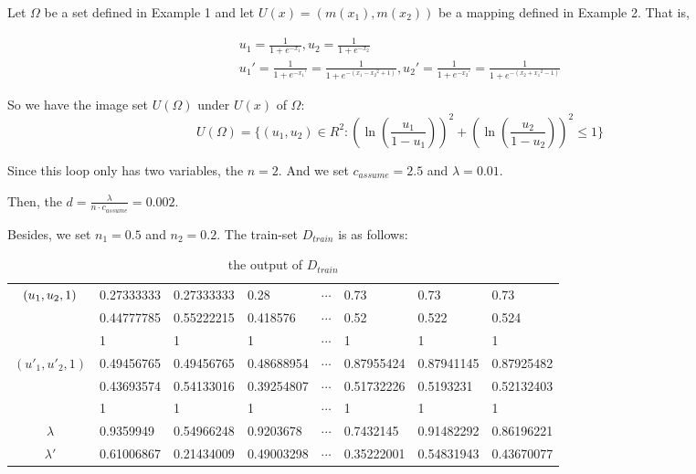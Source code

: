 \begin{exam}\label{exm3}
	Let $\Omega$ be a set defined in Example 1 and let $U(x)=(m(x_1),m(x_2))$ be a mapping defined in Example 2. That is,
	
	$$\begin{array}{l}
	{u_1} = \frac{1}{{1 + {e^{ - {x_1}}}}},{u_2} = \frac{1}{{1 + {e^{ - {x_2}}}}}\\
	{{u_1}'} = \frac{1}{{1 + {e^{ - {{x_1}'}}}}} = \frac{1}{{1 + {e^{ - ({x_1} - {x_2}^2 + 1)}}}},{{u_2}'} = \frac{1}{{1 + {e^{ - {{x_2}'}}}}} = \frac{1}{{1 + {e^{ - ({x_2} + {x_1}^2 - 1)}}}}
	\end{array}$$
	
	So we have the image set $U(\Omega)$ under $U(x)$ of $\Omega$:
	$$U(\Omega ) = \{ ({u_1},{u_2}) \in {R^2}:{(\ln (\frac{{{u_1}}}{{1 - {u_1}}}))^2} + {(\ln (\frac{{{u_2}}}{{1 - {u_2}}}))^2} \le 1\} $$
	
	Since this loop only has two variables, the $n=2$. And we set ${c_{assume}} = 2.5$ and $\lambda  = 0.01$.
	
	Then, the $d = \frac{\lambda }{{n\cdot{c_{assume}}}} = 0.002$.
	
	Besides, we set $n_1=0.5$ and $n_2=0.2$. The train-set $D_{train}$ is as follows:
	
	
	\begin{table}[H]{\label{output of Dtrain}}\label{tabel2}
		\begin{center}
			\setlength{\abovecaptionskip}{0pt}   
			\setlength{\belowcaptionskip}{0pt}
			\caption{the output of $D_{train}$}
			
			\begin{tabular}{|c|lllllll|}
				\hline
				\multirow{3}{*}{$({u_{\rm{1}}},{u_2},1)$} & 0.27333333 & 0.27333333 & 0.28       & $\cdots $ & 0.73       & 0.73       & 0.73       \\
				& 0.44777785 & 0.55222215 & 0.418576   & $\cdots $ & 0.52       & 0.522      & 0.524      \\
				& 1          & 1          & 1          & $\cdots $ & 1          & 1          & 1          \\ \hline
				\multirow{3}{*}{$({u'_1},{u'_2},1)$} & 0.49456765 & 0.49456765 & 0.48688954 & $\cdots $ & 0.87955424 & 0.87941145 & 0.87925482 \\
				& 0.43693574 & 0.54133016 & 0.39254807 & $\cdots $ & 0.51732226 & 0.5193231  & 0.52132403 \\
				& 1          & 1          & 1          & $\cdots $ & 1          & 1          & 1          \\ \hline
				$\lambda $& 0.9359949  & 0.54966248 & 0.9203678  & $\cdots $ & 0.7432145  & 0.91482292 & 0.86196221 \\ \hline
				$\lambda '$& 0.61006867 & 0.21434009 & 0.49003298 & $\cdots $ & 0.35222001 & 0.54831943 & 0.43670077 \\ \hline
			\end{tabular}
		\end{center}
	\end{table}
	
\end{exam} 

